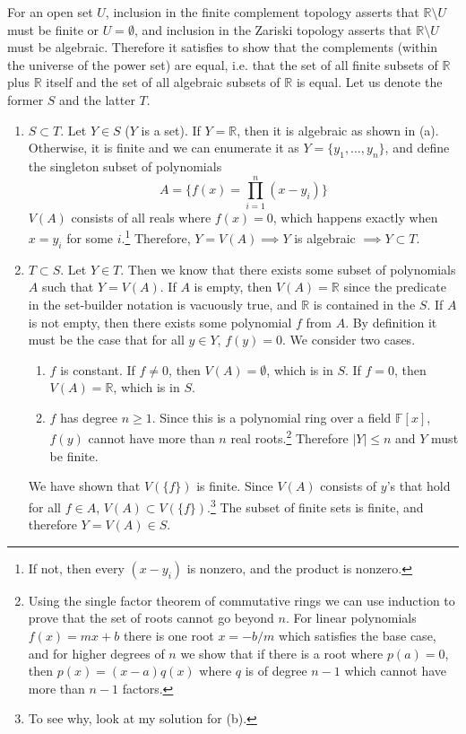  \begin{solution}[e]
    For an open set $U$, inclusion in the finite complement topology asserts that $\mathbb{R} \setminus U$ must be finite or $U = \emptyset$, and inclusion in the Zariski topology asserts that $\mathbb{R} \setminus U$ must be algebraic. Therefore it satisfies to show that the complements (within the universe of the power set) are equal, i.e. that the set of all finite subsets of $\mathbb{R}$ plus $\mathbb{R}$ itself and the set of all algebraic subsets of $\mathbb{R}$ is equal. Let us denote the former $S$ and the latter $T$. 
    \begin{enumerate}
      \item $S \subset T$. Let $Y \in S$ ($Y$ is a set). If $Y = \mathbb{R}$, then it is algebraic as shown in (a). Otherwise, it is finite and we can enumerate it as $Y = \{y_1, \ldots, y_n\}$, and define the singleton subset of polynomials 
      \begin{equation}
        A = \bigg\{ f(x) = \prod_{i=1}^n (x - y_i) \bigg\}
      \end{equation} 
      $V(A)$ consists of all reals where $f(x) = 0$, which happens exactly when $x = y_i$ for some $i$.\footnote{If not, then every $(x - y_i)$ is nonzero, and the product is nonzero.} Therefore, $Y = V(A) \implies Y$ is algebraic $\implies Y \subset T$. 

      \item $T \subset S$. Let $Y \in T$. Then we know that there exists some subset of polynomials $A$ such that $Y = V(A)$. If $A$ is empty, then $V(A) = \mathbb{R}$ since the predicate in the set-builder notation is vacuously true, and $\mathbb{R}$ is contained in the $S$. If $A$ is not empty, then there exists some polynomial $f$ from $A$. By definition it must be the case that for all $y \in Y$, $f(y) = 0$. We consider two cases. 
      \begin{enumerate}
        \item $f$ is constant. If $f \neq 0$, then $V(A) = \emptyset$, which is in $S$. If $f = 0$, then $V(A) = \mathbb{R}$, which is in $S$. 
        \item $f$ has degree $n \geq 1$. Since this is a polynomial ring over a field $\mathbb{F}[x]$, $f(y)$ cannot have more than $n$ real roots.\footnote{Using the single factor theorem of commutative rings we can use induction to prove that the set of roots cannot go beyond $n$. For linear polynomials $f(x) = mx + b$ there is one root $x = -b/m$ which satisfies the base case, and for higher degrees of $n$ we show that if there is a root where $p(a) = 0$, then $p(x) = (x - a) q(x)$ where $q$ is of degree $n-1$ which cannot have more than $n-1$ factors.} Therefore $|Y| \leq n$ and $Y$ must be finite. 
      \end{enumerate}

      We have shown that $V(\{f\})$ is finite. Since $V(A)$ consists of $y$'s that hold for all $f \in A$, $V(A) \subset V(\{f\})$.\footnote{To see why, look at my solution for (b).} The subset of finite sets is finite, and therefore $Y = V(A) \in S$. 
    \end{enumerate}
  \end{solution}

